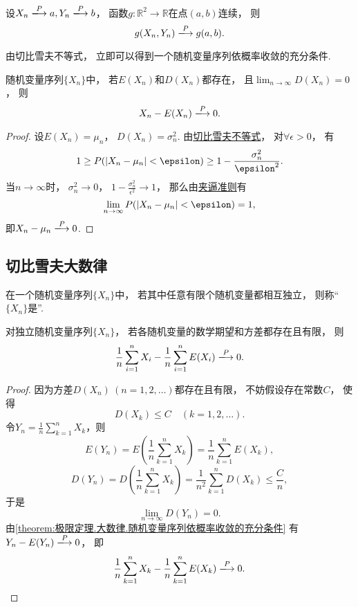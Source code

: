 \begin{proposition}
设\(X_n \toP a,
Y_n \toP b\)，
函数\(g\colon\mathbb{R}^2\to\mathbb{R}\)在点\((a,b)\)连续，
则\[
	g(X_n,Y_n) \toP g(a,b).
\]
\end{proposition}

由切比雪夫不等式，
立即可以得到一个随机变量序列依概率收敛的充分条件.
\begin{theorem}\label{theorem:极限定理.大数律.随机变量序列依概率收敛的充分条件}
随机变量序列\(\{X_n\}\)中，
若\(E(X_n)\)和\(D(X_n)\)都存在，
且\(\lim_{n\to\infty} D(X_n) = 0\)，
则\[
	X_n - E(X_n) \toP 0.
\]
\begin{proof}
设\(E(X_n)=\mu_n\)，
\(D(X_n)=\sigma_n^2\).
由\hyperref[equation:极限定理.切比雪夫不等式1]{切比雪夫不等式}，
对\(\forall \epsilon > 0\)，
有\[
	1 \geq P(\abs{X_n-\mu_n}<\epsilon) \geq 1 - \frac{\sigma_n^2}{\epsilon^2}.
\]
当\(n\to\infty\)时，
\(\sigma_n^2\to0\)，
\(1 - \frac{\sigma_n^2}{\epsilon^2} \to 1\)，
那么由\hyperref[theorem:函数极限.夹逼准则]{夹逼准则}有\[
	\lim_{n\to\infty} P(\abs{X_n-\mu_n}<\epsilon)=1,
\]
即\(X_n - \mu_n \toP 0\).
\end{proof}
\end{theorem}

\subsection{切比雪夫大数律}
\begin{definition}
在一个随机变量序列\(\{X_n\}\)中，
若其中任意有限个随机变量都相互独立，
则称“\(\{X_n\}\)是”.
\end{definition}

\begin{theorem}[切比雪夫大数律]\label{theorem:极限定理.大数律.切比雪夫大数律}
对独立随机变量序列\(\{X_n\}\)，
若各随机变量的数学期望和方差都存在且有限，
则\[
	\frac1n \sum_{i=1}^n X_i
	- \frac1n \sum_{i=1}^n E(X_i)
	\toP 0.
\]
\begin{proof}
因为方差\(D(X_n)\ (n=1,2,\dotsc)\)都存在且有限，
不妨假设存在常数\(C\)，
使得\[
	D(X_k) \leq C
	\quad(k=1,2,\dotsc).
\]
\def\Yn{\frac1n \sum_{k=1}^n X_k}
令\(Y_n=\Yn\)，则\[
	E(Y_n)
	= E\left(\Yn\right)
	= \frac1n \sum_{k=1}^n E(X_k),
\]\[
	D(Y_n)
	= D\left(\Yn\right)
	= \frac{1}{n^2} \sum_{k=1}^n D(X_k) \leq \frac{C}{n},
\]
于是\[
	\lim_{n\to\infty} D(Y_n)
	= 0.
\]
由\cref{theorem:极限定理.大数律.随机变量序列依概率收敛的充分条件}
有\(Y_n - E(Y_n) \toP 0\)，
即\[
	\frac1n \sum_{k=1}^n X_k
	- \frac1n \sum_{k=1}^n E(X_k)
	\toP 0.
	\qedhere
\]
\end{proof}
\end{theorem}

